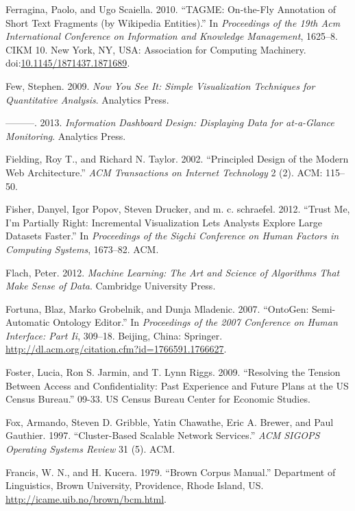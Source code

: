 \documentclass[]{krantz}
\begin{document}
\hypertarget{ref-ferragina-10}{}
Ferragina, Paolo, and Ugo Scaiella. 2010. ``TAGME: On-the-Fly Annotation
of Short Text Fragments (by Wikipedia Entities).'' In \emph{Proceedings
of the 19th Acm International Conference on Information and Knowledge
Management}, 1625--8. CIKM 10. New York, NY, USA: Association for
Computing Machinery.
doi:\href{https://doi.org/10.1145/1871437.1871689}{10.1145/1871437.1871689}.

\hypertarget{ref-few2009now}{}
Few, Stephen. 2009. \emph{Now You See It: Simple Visualization
Techniques for Quantitative Analysis}. Analytics Press.

\hypertarget{ref-few2013information}{}
---------. 2013. \emph{Information Dashboard Design: Displaying Data for
at-a-Glance Monitoring}. Analytics Press.

\hypertarget{ref-fielding2002principled}{}
Fielding, Roy T., and Richard N. Taylor. 2002. ``Principled Design of
the Modern Web Architecture.'' \emph{ACM Transactions on Internet
Technology} 2 (2). ACM: 115--50.

\hypertarget{ref-fisher2012trust}{}
Fisher, Danyel, Igor Popov, Steven Drucker, and m. c. schraefel. 2012.
``Trust Me, I'm Partially Right: Incremental Visualization Lets Analysts
Explore Large Datasets Faster.'' In \emph{Proceedings of the Sigchi
Conference on Human Factors in Computing Systems}, 1673--82. ACM.

\hypertarget{ref-Flach}{}
Flach, Peter. 2012. \emph{Machine Learning: The Art and Science of
Algorithms That Make Sense of Data}. Cambridge University Press.

\hypertarget{ref-Ontogen}{}
Fortuna, Blaz, Marko Grobelnik, and Dunja Mladenic. 2007. ``OntoGen:
Semi-Automatic Ontology Editor.'' In \emph{Proceedings of the 2007
Conference on Human Interface: Part Ii}, 309--18. Beijing, China:
Springer. \url{http://dl.acm.org/citation.cfm?id=1766591.1766627}.

\hypertarget{ref-foster2009resolving}{}
Foster, Lucia, Ron S. Jarmin, and T. Lynn Riggs. 2009. ``Resolving the
Tension Between Access and Confidentiality: Past Experience and Future
Plans at the US Census Bureau.'' 09-33. US Census Bureau Center for
Economic Studies.

\hypertarget{ref-fox1997cluster}{}
Fox, Armando, Steven D. Gribble, Yatin Chawathe, Eric A. Brewer, and
Paul Gauthier. 1997. ``Cluster-Based Scalable Network Services.''
\emph{ACM SIGOPS Operating Systems Review} 31 (5). ACM.

\hypertarget{ref-browncorpus}{}
Francis, W. N., and H. Kucera. 1979. ``Brown Corpus Manual.'' Department
of Linguistics, Brown University, Providence, Rhode Island, US.
\url{http://icame.uib.no/brown/bcm.html}.
\end{document}
